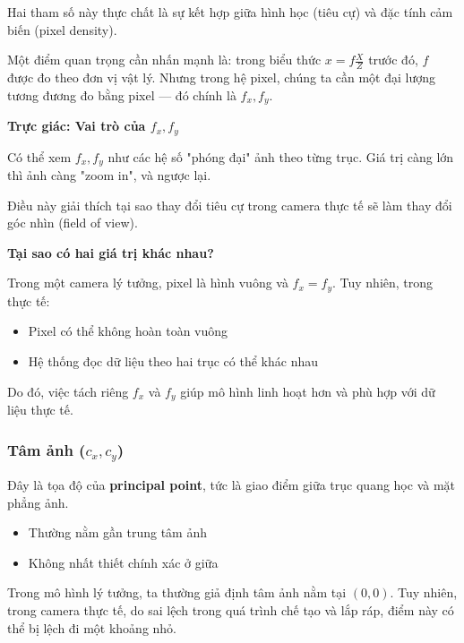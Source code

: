Hai tham số này thực chất là sự kết hợp giữa hình học (tiêu cự) và đặc tính cảm biến (pixel density).

Một điểm quan trọng cần nhấn mạnh là: trong biểu thức $x = f \frac{X}{Z}$ trước đó, $f$ được đo theo đơn vị vật lý. Nhưng trong hệ pixel, chúng ta cần một đại lượng tương đương đo bằng pixel — đó chính là $f_x, f_y$.

\begin{mdframed}[style=infobox]
	\textbf{Trực giác: Vai trò của $f_x, f_y$}
	
	Có thể xem $f_x, f_y$ như các hệ số "phóng đại" ảnh theo từng trục. Giá trị càng lớn thì ảnh càng "zoom in", và ngược lại.
	
	Điều này giải thích tại sao thay đổi tiêu cự trong camera thực tế sẽ làm thay đổi góc nhìn (field of view).
\end{mdframed}

\begin{mdframed}[style=infobox]
	\textbf{Tại sao có hai giá trị khác nhau?}
	
	Trong một camera lý tưởng, pixel là hình vuông và $f_x = f_y$. Tuy nhiên, trong thực tế:
	\begin{itemize}
		\item Pixel có thể không hoàn toàn vuông
		\item Hệ thống đọc dữ liệu theo hai trục có thể khác nhau
	\end{itemize}
	
	Do đó, việc tách riêng $f_x$ và $f_y$ giúp mô hình linh hoạt hơn và phù hợp với dữ liệu thực tế.
\end{mdframed}

\subsubsection{Tâm ảnh ($c_x, c_y$)}

Đây là tọa độ của \textbf{principal point}, tức là giao điểm giữa trục quang học và mặt phẳng ảnh.

\begin{itemize}
	\item Thường nằm gần trung tâm ảnh
	\item Không nhất thiết chính xác ở giữa
\end{itemize}

Trong mô hình lý tưởng, ta thường giả định tâm ảnh nằm tại $(0,0)$. Tuy nhiên, trong camera thực tế, do sai lệch trong quá trình chế tạo và lắp ráp, điểm này có thể bị lệch đi một khoảng nhỏ.

